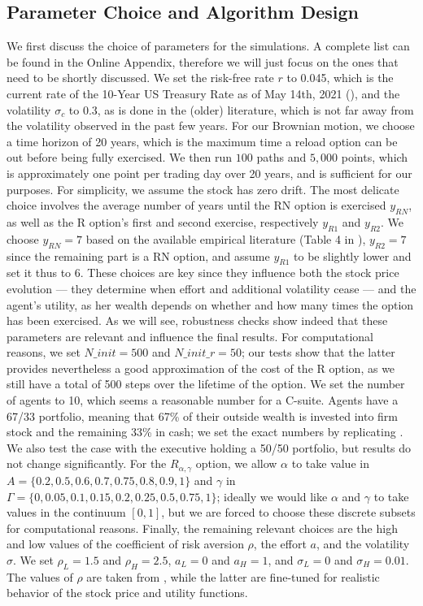 \subsection{Parameter Choice and Algorithm Design}
We first discuss the choice of parameters for the simulations. A complete list can be found in the Online Appendix,
therefore we will just focus on the ones that need to be shortly discussed. We set the risk-free rate $r$ to 0.045, which is the current rate of the 10-Year US Treasury Rate as of May 14th, 2021 (\cite{ychartrfrate}), and the volatility $\sigma_c$ to 0.3, as is done in the (older) literature, which is not far away from the volatility observed in the past few years. For our Brownian motion, we choose a time horizon of 20 years, which is the maximum time a reload option can be out before being fully exercised. We then run $100$ paths and $5,000$ points, which is approximately one point per trading day over 20 years, and is sufficient for our purposes. For simplicity, we assume the stock has zero drift. The most delicate choice involves the average number of years until the RN option is exercised $y_{RN}$, as well as the R option's first and second exercise, respectively $y_{R1}$ and $y_{R2}$. We choose $y_{RN} = 7$ based on the available empirical literature (Table 4 in \cite{murphy2019employees}), $y_{R2} = 7$ since the remaining part is a RN option, and assume $y_{R1}$ to be slightly lower and set it thus to 6. These choices are key since they influence both the stock price evolution --- they determine when effort and additional volatility cease --- and the agent's utility, as her wealth depends on whether and how many times the option has been exercised. As we will see, robustness checks show indeed that these parameters are relevant and influence the final results. For computational reasons, we set $N\_init = 500$ and $N\_init\_r = 50$; our tests show that the latter provides nevertheless a good approximation of the cost of the R option, as we still have a total of 500 steps over the lifetime of the option. We set the number of agents to 10, which seems a reasonable number for a C-suite. Agents have a 67/33 portfolio, meaning that 67\% of their outside wealth is invested into firm stock and the remaining 33\% in cash; we set the exact numbers by replicating \cite{carpenter1998exercise}. We also test the case with the executive holding a 50/50 portfolio, but results do not change significantly. For the $R_{\alpha, \gamma}$ option, we allow $\alpha$ to take value in $A = \{0.2, 0.5, 0.6, 0.7, 0.75, 0.8, 0.9, 1\}$ and $\gamma$ in $\Gamma = \{0, 0.05, 0.1, 0.15, 0.2, 0.25, 0.5, 0.75, 1\}$; ideally we would like $\alpha$ and $\gamma$ to take values in the continuum $[0, 1]$, but we are forced to choose these discrete subsets for computational reasons. Finally, the remaining relevant choices are the high and low values of the coefficient of risk aversion $\rho$, the effort $a$, and the volatility $\sigma$. We set $\rho_L = 1.5$ and $\rho_H = 2.5$, $a_L = 0$ and $a_H = 1$, and $\sigma_L = 0$ and $\sigma_H = 0.01$. The values of $\rho$ are taken from \cite{carpenter1998exercise}, while the latter are fine-tuned for realistic behavior of the stock price and utility functions. 


